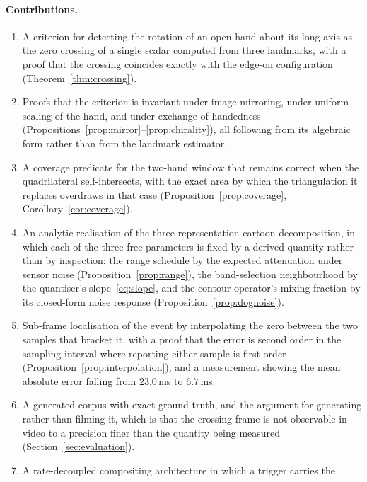 \documentclass{article}
\theoremstyle{definition}
\begin{document}
\paragraph{Contributions.}
\begin{enumerate}[leftmargin=*, topsep=2pt, itemsep=2pt]
  \item A criterion for detecting the rotation of an open hand about its long
        axis as the zero crossing of a single scalar computed from three
        landmarks, with a proof that the crossing coincides exactly with the
        edge-on configuration (Theorem~\ref{thm:crossing}).
  \item Proofs that the criterion is invariant under image mirroring, under
        uniform scaling of the hand, and under exchange of handedness
        (Propositions~\ref{prop:mirror}--\ref{prop:chirality}), all following
        from its algebraic form rather than from the landmark estimator.
  \item A coverage predicate for the two-hand window that remains correct when
        the quadrilateral self-intersects, with the exact area by which the
        triangulation it replaces overdraws in that case
        (Proposition~\ref{prop:coverage}, Corollary~\ref{cor:coverage}).
  \item An analytic realisation of the three-representation cartoon
        decomposition, in which each of the three free parameters is fixed by a
        derived quantity rather than by inspection: the range schedule by the
        expected attenuation under sensor noise
        (Proposition~\ref{prop:range}), the band-selection neighbourhood by the
        quantiser's slope~\eqref{eq:slope}, and the contour operator's mixing
        fraction by its closed-form noise response
        (Proposition~\ref{prop:dognoise}).
  \item Sub-frame localisation of the event by interpolating the zero between
        the two samples that bracket it, with a proof that the error is second
        order in the sampling interval where reporting either sample is first
        order (Proposition~\ref{prop:interpolation}), and a measurement showing
        the mean absolute error falling from $23.0$\,ms to $6.7$\,ms.
  \item A generated corpus with exact ground truth, and the argument for
        generating rather than filming it, which is that the crossing frame is
        not observable in video to a precision finer than the quantity being
        measured (Section~\ref{sec:evaluation}).
  \item A rate-decoupled compositing architecture in which a trigger carries the

\end{enumerate}
\end{document}
